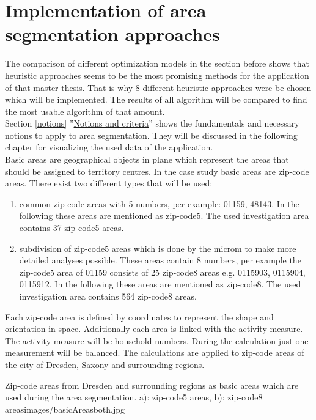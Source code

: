 \section{Implementation of area segmentation approaches}\label{Implementation}
The comparison of different optimization models in the section before shows that heuristic approaches seems to be the most promising methods for the application of that master thesis. That is why 8 different heuristic approaches were be chosen which will be implemented. The results of all algorithm will be compared to find the most usable algorithm of that amount.  \\
Section \ref{notions} ''\hyperref[notions]{Notions and criteria}'' shows the fundamentals and necessary notions to apply to area segmentation. They will be discussed in the following chapter for  visualizing the used data of the application. \\
Basic areas are geographical objects in plane which represent the areas that should be assigned to territory centres. In the case study basic areas are zip-code areas. There exist two different types that will be used:
\begin{enumerate}
	\item common zip-code areas with 5 numbers, per example: 01159, 48143. In the following these areas are mentioned as zip-code5. The used investigation area contains 37 zip-code5 areas.
	\item subdivision of zip-code5 areas which is done by the microm to make more detailed analyses possible. These areas contain 8 numbers, per example the zip-code5 area of 01159 consists of 25 zip-code8 areas e.g. 0115903, 0115904, 0115912. In the following these areas are mentioned as zip-code8. The used investigation area contains 564 zip-code8 areas.
\end{enumerate}

Each zip-code area is defined by coordinates to represent the shape and orientation in space. Additionally each area is linked with the activity measure. The activity measure will be household numbers. During the calculation just one measurement will be balanced. The calculations are applied to zip-code areas of the city of Dresden, Saxony and surrounding regions.

\begin{figureOwn}{Zip-code areas from Dresden and surrounding regions as basic areas which are used during the area segmentation. a): zip-code5 areas, b): zip-code8 areas}{images/basicAreasboth.jpg}\end{figureOwn}

